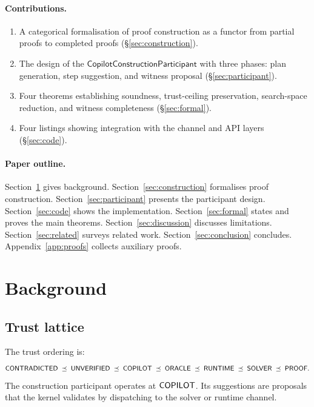 \documentclass[11pt]{article}
\newcommand{\CCP}{\mathsf{CopilotConstructionParticipant}}
\begin{document}
\paragraph{Contributions.}
\begin{enumerate}
\item A categorical formalisation of proof construction as
      a functor from partial proofs to completed proofs
      (\S\ref{sec:construction}).
\item The design of the $\CCP$ with three phases: plan
      generation, step suggestion, and witness proposal
      (\S\ref{sec:participant}).
\item Four theorems establishing soundness, trust-ceiling
      preservation, search-space reduction, and witness
      completeness (\S\ref{sec:formal}).
\item Four \Python{} listings showing integration with the
      channel and API layers (\S\ref{sec:code}).
\end{enumerate}

\paragraph{Paper outline.}
Section~\ref{sec:background} gives background.
Section~\ref{sec:construction} formalises proof construction.
Section~\ref{sec:participant} presents the participant design.
Section~\ref{sec:code} shows the implementation.
Section~\ref{sec:formal} states and proves the main theorems.
Section~\ref{sec:discussion} discusses limitations.
Section~\ref{sec:related} surveys related work.
Section~\ref{sec:conclusion} concludes.
Appendix~\ref{app:proofs} collects auxiliary proofs.

\section{Background}\label{sec:background}

\subsection{Trust lattice}

The trust ordering is:
\[
  \mathsf{CONTRADICTED} \;\preceq\; \mathsf{UNVERIFIED} \;\preceq\; \mathsf{COPILOT}
  \;\preceq\; \mathsf{ORACLE} \;\preceq\; \mathsf{RUNTIME}
  \;\preceq\; \mathsf{SOLVER} \;\preceq\; \mathsf{PROOF}.
\]
The construction participant operates at $\mathsf{COPILOT}$.
Its suggestions are proposals that the kernel validates
by dispatching to the solver or runtime channel.
\end{document}
